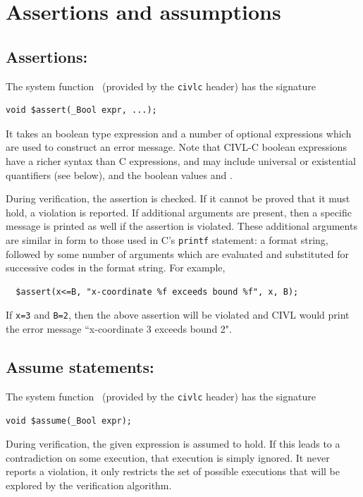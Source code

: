 \section{Assertions and assumptions}
\label{sec:assertionAndAssumption}
\subsection{Assertions: \cassert}

The system function \cassert\ (provided by the \texttt{civlc} header) has the signature
\begin{verbatim}
void $assert(_Bool expr, ...);
\end{verbatim}

It takes an boolean type expression and a number of optional expressions which are used to construct an error message.
Note that CIVL-C boolean expressions have a richer syntax than C
expressions, and may include universal or existential quantifiers
(see below), and the boolean values  \ctrue{} and \cfalse{}.

During verification, the assertion is checked.  If it cannot be proved
that it must hold, a violation is reported. If additional arguments are present, then a specific message is printed as well if the assertion is violated.  These
additional arguments are similar in form to those used in C's
\texttt{printf} statement: a format string, followed by some number of
arguments which are evaluated and substituted for successive codes in
the format string.  For example,
\begin{verbatim}
  $assert(x<=B, "x-coordinate %f exceeds bound %f", x, B); 
\end{verbatim}

If \texttt{x=3} and \texttt{B=2}, then the above assertion will be violated and CIVL would print the error message ``x-coordinate 3 exceeds bound 2".

\subsection{Assume statements: \cassume}

The system function \cassume\ (provided by the \texttt{civlc} header) has the signature
\begin{verbatim}
void $assume(_Bool expr);
\end{verbatim}

During verification, the given expression is assumed to hold.  If
this leads to a contradiction on some execution, that execution is
simply ignored.  It never reports a violation, it only restricts the
set of possible executions that will be explored by the verification
algorithm.

